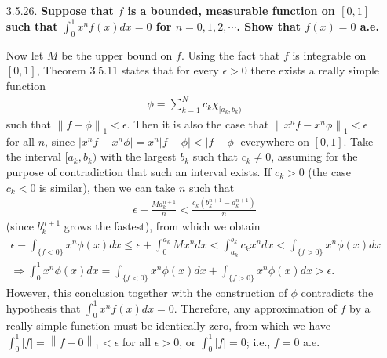 \documentclass[a4paper,12pt]{article}
\newcommand{\norm}[1]{\left\lVert#1\right\rVert}
\begin{document}
\begin{enumerate}
    \item[3.5.26.]
        \boldmath\textbf{Suppose that $f$ is a bounded, measurable function on $[0, 1]$ such that $\int_0^1 x^n f(x) dx = 0$ for $n = 0, 1, 2, \cdots$. Show that $f(x) = 0$ a.e.
        }\unboldmath \par
        \iffalse
            Now let $M$ be the upper bound on $f$. Using the fact that $f$ is integrable on $[0, 1]$, Theorem 3.5.11 states that for every $\epsilon > 0$ there exists a really simple function
            \begin{align*}
                \phi = \sum_{k = 1}^N c_k \chi_{[a_k, b_k)}
            \end{align*}
            such that $\norm{f - \phi}_1 < \epsilon$. Then it is also the case that $\norm{x^n f - x^n \phi}_1 < \epsilon$ for all $n$, since $|x^n f - x^n \phi| = x^n |f - \phi| < |f - \phi|$ everywhere on $[0, 1]$. Take the interval $[a_k, b_k)$ with the largest $b_k$ such that $c_k \neq 0$, assuming for the purpose of contradiction that such an interval exists. If $c_k > 0$ (the case $c_k < 0$ is similar), then we can take $n$ such that
            \begin{align*}
                \epsilon + \frac{M a_k^{n + 1}}{n} < \frac{c_k(b_k^{n + 1} - a_k^{n + 1})}{n}
            \end{align*}
            (since $b_k^{n + 1}$ grows the fastest), from which we obtain
            \begin{gather*}
                \epsilon - \int_{\{f < 0\}} x^n \phi(x) dx \leq \epsilon + \int_0^{a_k} M x^n dx < \int_{a_k}^{b_k} c_k x^n dx < \int_{\{f > 0\}} x^n \phi(x) dx \\
                \Rightarrow 
                \int_0^1 x^n \phi(x) dx = \int_{\{f < 0\}} x^n \phi(x) dx + \int_{\{f > 0\}} x^n \phi(x) dx > \epsilon.
            \end{gather*}
            However, this conclusion together with the construction of $\phi$ contradicts the hypothesis that $\int_0^1 x^n f(x) dx = 0$. Therefore, any approximation of $f$ by a really simple function must be identically zero, from which we have $\int_0^1 |f| = \norm{f - 0}_1 < \epsilon$ for all $\epsilon > 0$, or $\int_0^1 |f| = 0$; i.e., $f = 0$ a.e.

\end{enumerate}
\end{document}
